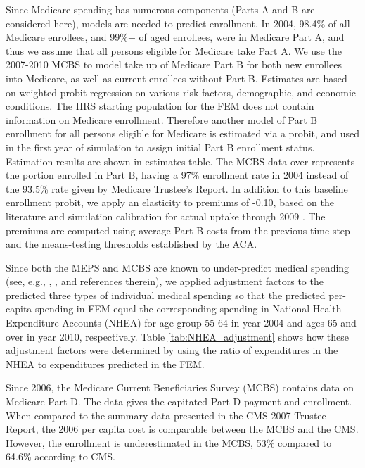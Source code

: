 Since Medicare spending has numerous components (Parts A and B are considered here), models are needed to predict enrollment. In 2004, 
98.4\% of all Medicare enrollees, and 99\%+ of aged enrollees, were in Medicare Part A, and thus we assume that all persons eligible for 
Medicare take Part A. We use the 2007-2010 MCBS to model take up of Medicare Part B for both new enrollees into Medicare, as well as 
current enrollees without Part B. Estimates are based on weighted probit regression on various risk factors, demographic, and economic 
conditions. The HRS starting population for the FEM does not contain information on Medicare enrollment. Therefore another model of Part B 
enrollment for all persons eligible for Medicare is estimated via a probit, and used in the first year of simulation to assign initial Part 
B enrollment status. Estimation results are shown in estimates table. The MCBS data over represents the portion enrolled in Part B, having a 97\% 
enrollment rate in 2004 instead of the 93.5\% rate given by Medicare Trustee's Report. In addition to this baseline enrollment probit, we 
apply an elasticity to premiums of -0.10, based on the literature and simulation 
calibration for actual uptake through 2009 \citep{atherly2004effect,buchmueller2006price}. 
The premiums are computed using average Part B costs from the previous time step 
and the means-testing thresholds established by the ACA.

Since both the MEPS and MCBS are known to under-predict medical spending (see, e.g., \citeauthor{selden2008aligning}, \citeyear{selden2008aligning}, and references therein), we applied adjustment factors to the predicted three types of 
individual medical spending so that the predicted per-capita spending in FEM equal the corresponding spending in National 
Health Expenditure Accounts (NHEA) for age group 55-64 in year 2004 and ages 65 and over in year 2010, respectively. Table 
\ref{tab:NHEA_adjustment} shows how these adjustment factors were determined by using the ratio of expenditures in the NHEA to 
expenditures predicted in the FEM.  

Since 2006, the Medicare Current Beneficiaries Survey (MCBS) contains data on Medicare Part D. The data gives the capitated Part D payment and 
enrollment. When compared to the summary data presented in the CMS 2007 Trustee Report, the 2006 per capita cost is comparable between the MCBS 
and the CMS. However, the enrollment is underestimated in the MCBS, 53\% compared to 64.6\% according to CMS. 


